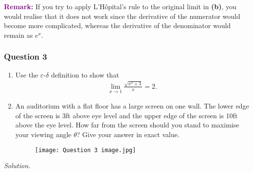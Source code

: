 \documentclass[12pt]{article}
\begin{document}
\textbf{\textsf{\textcolor{purple}{Remark:}}} If you try to apply L'Hôpital's rule to the original limit in \textbf{(b)}, you would realise that it does not work since the derivative of the numerator would become more complicated, whereas the derivative of the denominator would remain as $e^x$.
\subsubsection*{Question 3}
\begin{enumerate}[label=\textbf{(\alph*)}]
    \itemsep 0em
    \item Use the $\varepsilon$-$\delta$ definition to show that \begin{align*}
        \lim_{x\rightarrow 1}\frac{\sqrt{x^2+3}}{x}=2.
    \end{align*}
    \item An auditorium with a flat floor has a large screen on one wall. The lower edge of the screen is 3ft above eye level and the upper edge of the screen is 10ft above the eye level. How far from the screen should you stand to maximise your viewing angle $\theta$? Give your answer in exact value.
    \begin{figure}[h!]
        \centering
        \texttt{[image: Question 3 image.jpg]}
    \end{figure}
\end{enumerate}
\textit{Solution.}
\end{document}
